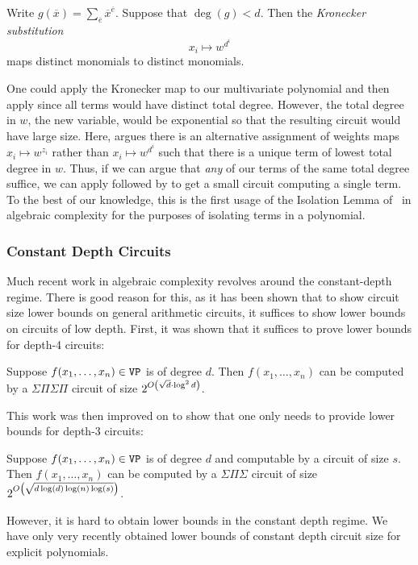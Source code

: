 \documentclass[letterpaper, 11pt]{amsart}
\begin{document}
\begin{lem}
  Write $g(\overline{x}) = \sum_{\overline{e}} \overline{x}^{\overline{e}}$.
  Suppose that $\deg(g) < d$.
  Then the \emph{Kronecker substitution}
  \[
    x_i \mapsto w^{d^i}
  \]
  maps distinct monomials to distinct monomials.
\end{lem}

One could apply the Kronecker map to our multivariate polynomial and then apply  since all terms would have distinct total degree.
However, the total degree in $w$, the new variable, would be exponential so that the resulting circuit would have large size.
Here,  argues there is an alternative assignment of weights maps $x_i \mapsto w^{z_i}$ rather than $x_i \mapsto w^{d^i}$ such that there is a unique term of lowest total degree in $w$.
Thus, if we can argue that \emph{any} of our terms of the same total degree suffice, we can apply  followed by  to get a small circuit computing a single term.
To the best of our knowledge, this is the first usage of the Isolation Lemma of~\cite{MVV87, KS01} in algebraic complexity for the purposes of isolating terms in a polynomial.

\subsubsection{Constant Depth Circuits}

Much recent work in algebraic complexity revolves around the constant-depth regime.
There is good reason for this, as it has been shown that to show circuit size lower bounds on general arithmetic circuits, it suffices to show lower bounds on circuits of low depth.
First, it was shown that it suffices to prove lower bounds for depth-4 circuits:

\begin{thrm}
  Suppose $f(x_1, \ldots, x_n) \in \operatorname{\texttt{VP}}$ is of degree $d$.
  Then $f(x_1, \ldots, x_n)$ can be computed by a $\Sigma \Pi \Sigma \Pi$ circuit of size $2^{O\kern-0.0pt\left(\sqrt{d} \cdot \log^2 d\right)}$.
\end{thrm}

This work was then improved on to show that one only needs to provide lower bounds for depth-3 circuits:

\begin{thrm}
  Suppose $f(x_1, \ldots, x_n) \in \operatorname{\texttt{VP}}$ is of degree $d$ and computable by a circuit of size $s$.
  Then $f(x_1, \ldots, x_n)$ can be computed by a $\Sigma \Pi \Sigma$ circuit of size $2^{O\kern-0.0pt\left(\sqrt{d \log(d) \log(n) \log(s)}\right)}$.
\end{thrm}
However, it is hard to obtain lower bounds in the constant depth regime.
We have only very recently obtained lower bounds of constant depth circuit size for explicit polynomials.
\end{document}
